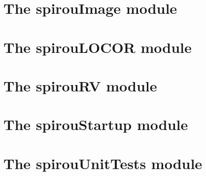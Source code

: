 \section{The spirouImage module}
\label{ch:the_module:spirouImage}


\section{The spirouLOCOR module}
\label{ch:the_module:spirouLOCOR}


\section{The spirouRV module}
\label{ch:the_module:spirouRV}


\section{The spirouStartup module}
\label{ch:the_module:spirouStartup}


\section{The spirouUnitTests module}
\label{ch:the_module:spirouUnitTests}
